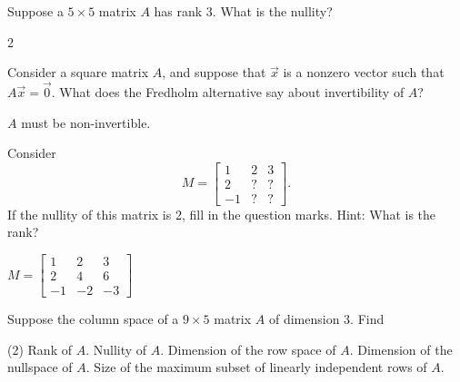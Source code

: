 \begin{exercise}
Suppose a $5 \times 5$ matrix $A$ has rank 3.  What is the nullity?
\end{exercise}
\comboSol{%
}
{%
2
}

\begin{exercise}
Consider a square matrix $A$, and suppose that $\vec{x}$ is a nonzero
vector such that $A \vec{x} = \vec{0}$.  What does the Fredholm alternative
say about invertibility of $A$?
\end{exercise}
\comboSol{%
}
{%
$A$ must be non-invertible.
}

\begin{exercise}
Consider
\begin{equation*}
M =
\begin{bmatrix}
1 & 2 & 3 \\
2 & ? & ? \\
-1 & ? & ?
\end{bmatrix} .
\end{equation*}
If the nullity of this matrix is 2, fill in the question marks.  Hint: What
is the rank?
\end{exercise}
\comboSol{%
}
{%
$M = \left[\begin{smallmatrix} 1 & 2 & 3 \\ 2 & 4 & 6 \\ -1 & -2 & -3 \end{smallmatrix}\right]$
}

\begin{exercise}\ansMark%
Suppose the column space of a $9 \times 5$ matrix $A$ of dimension 3.  Find
\begin{tasks}(2)
\task
Rank of $A$.
\task
Nullity of $A$.
\task
Dimension of the row space of $A$.
\task
Dimension of the nullspace of $A$.
\task
Size of the maximum subset of
linearly independent rows of $A$.
\end{tasks}
\end{exercise}

